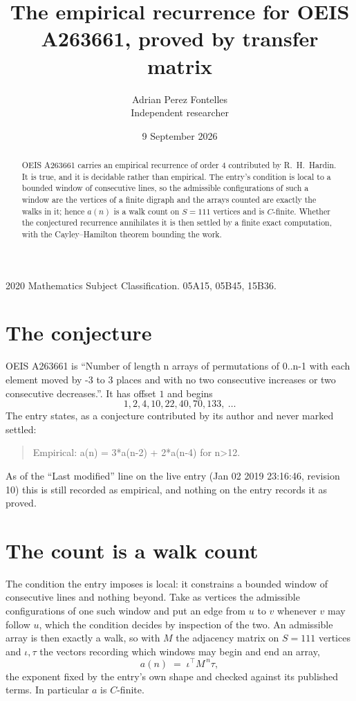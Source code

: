 \documentclass[11pt,a4paper]{article}
\title{The empirical recurrence for OEIS A263661, proved by transfer matrix}
\author{Adrian Perez Fontelles\\ \small Independent researcher}
\date{9 September 2026}
\theoremstyle{plain}
\theoremstyle{definition}
\begin{document}
\maketitle

\begin{abstract}
OEIS A263661 carries an empirical recurrence of order $4$ contributed by R.~H.~Hardin. It is
true, and it is decidable rather than empirical. The entry's condition is local to a bounded window of consecutive lines, so
the admissible configurations of such a window are the vertices of a finite digraph and the
arrays counted are exactly the walks in it; hence $a(n)$ is a walk count on $S=111$ vertices
and is $C$-finite. Whether the conjectured recurrence annihilates it is then settled by a
finite exact computation, with the Cayley--Hamilton theorem bounding the work.
\end{abstract}

\noindent\small 2020 Mathematics Subject Classification. 05A15, 05B45, 15B36.\normalsize

\section{The conjecture}

OEIS A263661 is ``Number of length n arrays of permutations of 0..n-1 with each element moved by -3 to 3 places and with no two consecutive increases or two consecutive decreases.''. It has offset $1$ and begins
\[
1, 2, 4, 10, 22, 40, 70, 133,\ \dots
\]
The entry states, as a conjecture contributed by its author and never marked settled:
\begin{quote}
Empirical: a(n) = 3*a(n-2) + 2*a(n-4) for n>12.
\end{quote}
As of the ``Last modified'' line on the live entry (Jan 02 2019 23:16:46, revision 10) this is still
recorded as empirical, and nothing on the entry records it as proved.

\section{The count is a walk count}

The condition the entry imposes is local: it constrains a bounded window of consecutive lines and nothing beyond. Take as
vertices the admissible configurations of one such window and put an edge from $u$ to $v$
whenever $v$ may follow $u$, which the condition decides by inspection of the two. An
admissible array is then exactly a walk, so with $M$ the adjacency matrix on $S=111$ vertices
and $\iota,\tau$ the vectors recording which windows may begin and end an array,
\[
a(n)\;=\;\iota^{\!\top}M^{\,n}\tau ,
\]
the exponent fixed by the entry's own shape and checked against its published terms. In
particular $a$ is $C$-finite.
\end{document}
